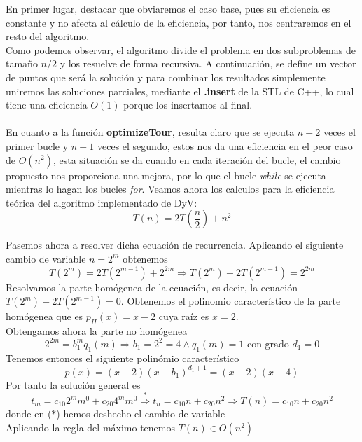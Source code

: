 \documentclass[11pt,openany]{book}
\begin{document}
En primer lugar, destacar que obviaremos el caso base, pues su eficiencia es constante y no afecta al cálculo de la eficiencia, por tanto, nos centraremos en el
resto del algoritmo. \\
Como podemos observar, el algoritmo divide el problema en dos subproblemas de tamaño $n/2$ y los resuelve de forma recursiva. A continuación, se define un vector
de puntos que será la solución y para combinar los resultados simplemente uniremos las soluciones parciales, mediante el \textbf{.insert} de la STL de C++, lo cual
tiene una eficiencia $O(1)$ porque los insertamos al final.  \\ \\
En cuanto a la función \textbf{optimizeTour}, resulta claro que se ejecuta
$n-2$ veces el primer bucle y $n-1$ veces el segundo, estos nos da una eficiencia en el peor caso de
$O(n^2)$, esta situación se da cuando en cada iteración del bucle, el cambio propuesto nos proporciona
una mejora, por lo que el bucle \textit{while} se ejecuta mientras lo hagan los bucles \textit{for}. Veamos ahora los calculos para la eficiencia teórica del algoritmo
implementado de DyV:
\begin{equation*}
      T(n)=2T\left(\frac{n}{2}\right)+n^2
\end{equation*}

Pasemos ahora a resolver dicha ecuación de recurrencia. Aplicando el siguiente cambio de variable $n=2^m$ obtenemos
\begin{equation*}
      T(2^m)=2T(2^{m-1})+2^{2m} \Rightarrow T(2^m)-2T(2^{m-1})=2^{2m}
\end{equation*}
Resolvamos la parte homógenea de la ecuación, es decir, la ecuación $T(2^m)-2T(2^{m-1})=0$. Obtenemos el polinomio
característico de la parte homógenea que es $p_H(x)=x-2$ cuya raíz es $x=2$. \\
Obtengamos ahora la parte no homógenea
\begin{equation*}
      2^{2m}=b_1^m q_1(m) \Rightarrow b_1=2^2=4 \wedge q_1(m)=1 \text{ con grado } d_1=0
\end{equation*}
Tenemos entonces el siguiente polinómio característico
\begin{equation*}
      p(x)=(x-2)(x-b_1)^{d_1+1}=(x-2)(x-4)
\end{equation*}
Por tanto la solución general es
\begin{equation*}
      t_m=c_{10}2^mm^0+c_{20}4^mm^0\overset{*}{\Rightarrow}  t_n=c_{10}n+c_{20}n^2 \Rightarrow T(n)=c_{10}n+c_{20}n^2
\end{equation*}
donde en ($*$) hemos deshecho el cambio de variable \\
Aplicando la regla del máximo tenemos $T(n) \in O(n^2)$
\end{document}
